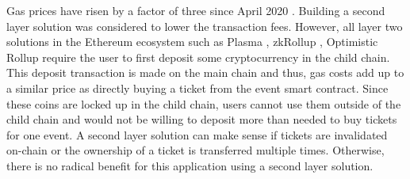 Gas prices have risen by a factor of three since April 2020 \cite{ethereum-gas-price-chart}. Building a second layer solution was considered to lower the transaction fees. However, all layer two solutions in the Ethereum ecosystem such as Plasma \cite{plasma}, zkRollup \cite{zkrollup}, Optimistic Rollup \cite{optimistic-rollup} require the user to first deposit some cryptocurrency in the child chain. This deposit transaction is made on the main chain and thus, gas costs add up to a similar price as directly buying a ticket from the event smart contract. Since these coins are locked up in the child chain, users cannot use them outside of the child chain and would not be willing to deposit more than needed to buy tickets for one event. A second layer solution can make sense if tickets are invalidated on-chain or the ownership of a ticket is transferred multiple times. Otherwise, there is no radical benefit for this application using a second layer solution. 
